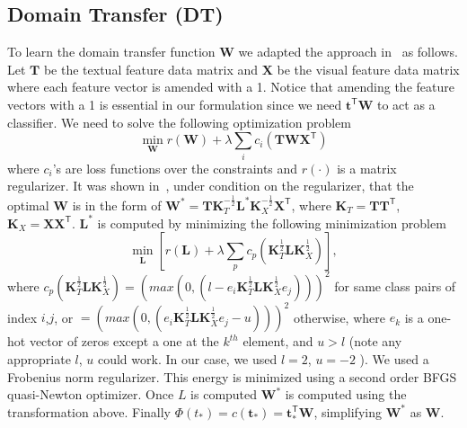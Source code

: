 \subsection{Domain Transfer (DT)}
\label{S:DA}
To learn the domain transfer function $\mathbf{W}$ we adapted the approach in~\cite{da11} as follows. Let $\mathbf{T}$ be the textual feature data matrix and $\mathbf{X}$ be the visual feature data matrix where each feature vector is amended with a 1. Notice that amending the feature vectors with a 1 is essential in our formulation since we need $\mathbf{t}^\textsf{T} \mathbf{W}$ to act as a classifier. We need to solve the following optimization problem 
\begin{equation}
  \min_{\mathbf{W}}  r(\mathbf{W}) + \lambda \sum_i c_i(\mathbf{T} \mathbf{W} \mathbf{X}^\textsf{T})
  \label{Eq:DA1}
\end{equation}
where $c_i$'s are loss functions over the constraints and $r(\cdot)$ is a matrix regularizer.  It was shown in~\cite{da11}, under condition on the regularizer, that the optimal $\mathbf{W}$  is in the form of 
 $ \mathbf{W}^* = \mathbf{T} \mathbf{K}_{T}^{-\frac{1}{2}} \mathbf{L}^*  \mathbf{K}_{X}^{-\frac{1}{2}} \mathbf{X}^\textsf{T}$, where  $\mathbf{K}_{T}  = \mathbf{T} \mathbf{T}^\textsf{T}$,  $\mathbf{K}_{X}  = \mathbf{X} \mathbf{X}^\textsf{T}$.   $\mathbf{L}^*$ is computed by minimizing the following minimization problem
\begin{equation}
 \underset{\mathbf{L}}{\operatorname{min       }}[   r(\mathbf{L})+ \lambda \sum_p c_p(\mathbf{K}_{T}^{\frac{1}{2}} \mathbf{L} \mathbf{K}_{X}^\frac{1}{2}  ) ],
\end{equation}
where $c_p(\mathbf{K}_{T}^{\frac{1}{2}} \mathbf{L} \mathbf{K}_{X}^\frac{1}{2}  ) = (max(0, (l-e_i \mathbf{K}_{T}^{\frac{1}{2}} \mathbf{L} \mathbf{K}_{X}^\frac{1}{2} e_j) ))^2$ for same class pairs of index $i$,$j$, or $ =(max(0, (e_i \mathbf{K}_{T}^{\frac{1}{2}} \mathbf{L} \mathbf{K}_{X}^\frac{1}{2} e_j -u) ))^ 2$ otherwise, where $e_k$ is a one-hot vector of zeros except a one at the $k^{th}$ element, and $u>l$ (note any appropriate $l$, $u$ could work. In our case, we used $l =2$, $u=-2$ ). We used a Frobenius norm regularizer.  This energy is minimized using a second order BFGS quasi-Newton optimizer. Once $L$ is computed $\textbf{W}^*$ is computed using the transformation above. Finally ${\Phi (t_*)}  = c(\mathbf{t}_*) = \mathbf{t}_*^\textsf{T}\mathbf{W}$, simplifying  $\textbf{W}^*$ as $\textbf{W}$.  




